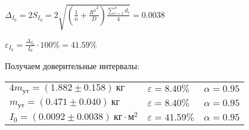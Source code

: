 \begin{enumerate}
    $\displaystyle \Delta_{I_0} = 2S_{{I_0}} = 2\sqrt{\left(\frac{1}{n} + \frac{\overline{R^2}^2}{D}\right) \frac{\sum_{i = 1}^n d_i}{4}} = 0.0038$

    $\displaystyle \varepsilon_{I_0} = \frac{\Delta_{I_0}}{I_0} \cdot 100\% = 41.59\%$

    Получаем доверительные интервалы:

    \begin{tabular}{lll}
        $4m_{\text{ут}} = (1.882 \pm 0.158) \ \text{кг}$ & $\varepsilon = 8.40\%$ & $\alpha = 0.95$ \\

        $m_{\text{ут}} = (0.471 \pm 0.040) \ \text{кг}$ & $\varepsilon = 8.40\%$ & $\alpha = 0.95$ \\

        $I_0 = (0.0092 \pm 0.0038) \ \text{кг} \cdot \text{м}^2$ & $\varepsilon = 41.59\%$ & $\alpha = 0.95$ \\
    \end{tabular}

    \smallvspace



\end{enumerate}